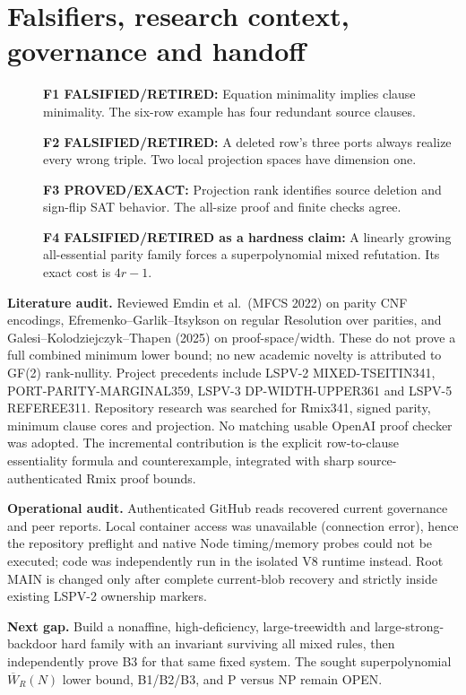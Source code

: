 \documentclass[11pt]{article}
\begin{document}
\section*{Falsifiers, research context, governance and handoff}
\begin{description}
\item[] \textbf{F1 FALSIFIED/RETIRED:} Equation minimality implies clause minimality. The six-row example has four redundant source clauses.
\item[] \textbf{F2 FALSIFIED/RETIRED:} A deleted row's three ports always realize every wrong triple. Two local projection spaces have dimension one.
\item[] \textbf{F3 PROVED/EXACT:} Projection rank identifies source deletion and sign-flip SAT behavior. The all-size proof and finite checks agree.
\item[] \textbf{F4 FALSIFIED/RETIRED as a hardness claim:} A linearly growing all-essential parity family forces a superpolynomial mixed refutation. Its exact cost is $4r-1$.
\end{description}
\noindent\textbf{Literature audit.} Reviewed Emdin et al.\ (MFCS 2022) on parity CNF encodings, Efremenko--Garlik--Itsykson on regular Resolution over parities, and Galesi--Kolodziejczyk--Thapen (2025) on proof-space/width. These do not prove a full combined minimum lower bound; no new academic novelty is attributed to GF(2) rank-nullity. Project precedents include LSPV-2 MIXED-TSEITIN341, PORT-PARITY-MARGINAL359, LSPV-3 DP-WIDTH-UPPER361 and LSPV-5 REFEREE311. Repository research was searched for Rmix341, signed parity, minimum clause cores and projection. No matching usable OpenAI proof checker was adopted. The incremental contribution is the explicit row-to-clause essentiality formula and counterexample, integrated with sharp source-authenticated Rmix proof bounds.

\noindent\textbf{Operational audit.} Authenticated GitHub reads recovered current governance and peer reports. Local container access was unavailable (connection error), hence the repository preflight and native Node timing/memory probes could not be executed; code was independently run in the isolated V8 runtime instead. Root MAIN is changed only after complete current-blob recovery and strictly inside existing LSPV-2 ownership markers.

\noindent\textbf{Next gap.} Build a nonaffine, high-deficiency, large-treewidth and large-strong-backdoor hard family with an invariant surviving all mixed rules, then independently prove B3 for that same fixed system. The sought superpolynomial $\overline W_R(N)$ lower bound, B1/B2/B3, and P versus NP remain OPEN.
\end{document}
